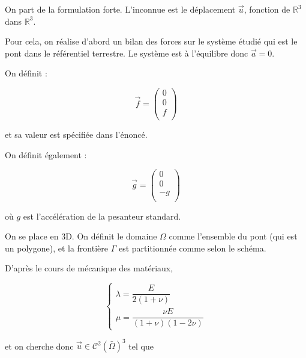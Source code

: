 On part de la formulation forte. L'inconnue est le déplacement $\vec{u}$, fonction de $\mathbb{R}^3$ dans $\mathbb{R}^3$.

Pour cela, on réalise d'abord un bilan des forces sur le système étudié qui est le pont dans le référentiel terrestre. Le système est à l'équilibre donc $\vec{a} = 0$.

On définit :

\begin{equation}
    \vec{f} = \begin{pmatrix} 0\\ 0\\ f\\\end{pmatrix}
\end{equation}

et sa valeur est spécifiée dans l'énoncé.

On définit également :

\begin{equation}
    \vec{g} = \begin{pmatrix} 0\\ 0\\ -g\\\end{pmatrix}
\end{equation}

où $g$ est l'accélération de la pesanteur standard.

On se place en 3D. On définit le domaine $\Omega$ comme l'ensemble du pont (qui est un polygone), et la frontière $\Gamma$ est partitionnée comme selon le schéma.

D'après le cours de mécanique des matériaux,

\begin{equation}
    \begin{cases}
        \lambda = \dfrac{E}{2(1+\nu)}\\
        \mu = \dfrac{\nu E}{(1+\nu)(1-2\nu)}
    \end{cases}
\end{equation}

et on cherche donc $\vec{u} \in \mathcal{C}^2(\bar{\Omega})^3$ tel que

